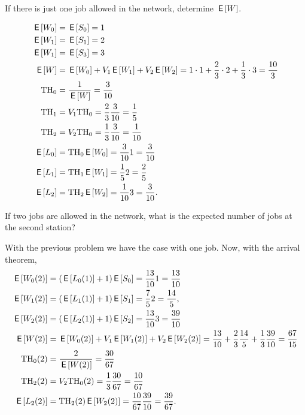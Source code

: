 \begin{exercise}[201807]{1}
  If there is just one job allowed in the network, determine $\E W$.
\begin{solution}
    \begin{align*}
    \E{W_0} &= \E{S_0} = 1\\      
    \E{W_1} &= \E{S_1} = 2\\
    \E{W_1} &= \E{S_3} = 3\\
\E W &= \E{W_0} + V_1 \E{W_1} + V_2 \E{W_2} = 1\cdot 1 + \frac{2}{3}\cdot 2 +  \frac{1}{3} \cdot 3 = \frac{10}{3}\\
\TH_0 &= \frac{1}{\E W} = \frac{3}{10}\\
\TH_1&= V_1 \TH_0 = \frac{2}{3} \frac{3}{10}=\frac{1}{5}\\
\TH_2&= V_2 \TH_0 = \frac{1}{3} \frac{3}{10}=\frac{1}{10}\\
\E{L_0} &= \TH_0 \E{W_0} = \frac{3}{10} 1 = \frac{3}{10}\\
\E{L_1} &= \TH_1 \E{W_1} = \frac{1}{5} 2 = \frac{2}{5}\\
\E{L_2} &= \TH_2 \E{W_2} = \frac{1}{10} 3 = \frac{3}{10}.
    \end{align*}
\end{solution}

\end{exercise}

\begin{exercise}[201807]{2}
If two jobs are allowed in the network, what is the expected number of jobs at the second station?
\begin{solution}
    With the previous problem we have the case with one job. Now, with the arrival theorem,
    \begin{align*}
\E{W_{0}(2)} &= (\E{L_0(1)} + 1)\E{S_0} = \frac{13}{10} 1 = \frac{13}{10} \\
\E{W_{1}(2)} &= (\E{L_1(1)} + 1)\E{S_1} = \frac{7}{5} 2 = \frac{14}{5}, \\
\E{W_{2}(2)} &= (\E{L_2(1)} + 1)\E{S_2} = \frac{13}{10} 3 = \frac{39}{10} \\
\E{W(2)} &= \E{W_0(2)} + V_1 \E{W_1(2)} + V_2 \E{W_2(2)} = \frac{13}{10}+ \frac{2}{3}\frac{14}{5} +  \frac{1}{3}\frac{39}{10}=\frac{67}{15}\\
\TH_0(2) &= \frac{2}{\E{W(2)}} = \frac{30}{67}\\
\TH_2(2) &= V_2 \TH_0(2) = \frac{1}{3} \frac{30}{67}=\frac{10}{67}\\
\E{L_2(2)} &= \TH_2(2) \E{W_2(2)} = \frac{10}{67} \frac{39}{10} = \frac{39}{67}.
    \end{align*}

\end{solution}
\end{exercise}


